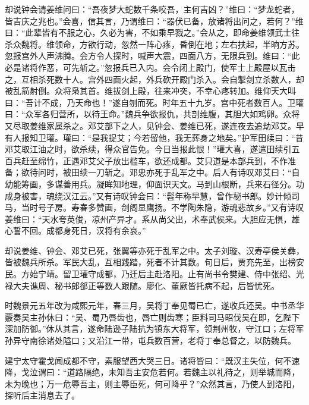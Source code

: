 却说钟会请姜维问曰：“吾夜梦大蛇数千条咬吾，主何吉凶？”维曰：“梦龙蛇者，皆吉庆之兆也。”会喜，信其言，乃谓维曰：“器伏已备，放诸将出问之，若何？”维曰：“此辈皆有不服之心，久必为害，不如乘早戮之。”会从之，即命姜维领武士往杀众魏将。维领命，方欲行动，忽然一阵心疼，昏倒在地；左右扶起，半晌方苏。忽报宫外人声沸腾。会方令人探时，喊声大震，四面八方，无限兵到。维曰：“此必是诸将作恶，可先斩之。”忽报兵已入内。会令闭上殿门，使军士上殿屋以瓦击之，互相杀死数十人。宫外四面火起，外兵砍开殿门杀入。会自掣剑立杀数人，却被乱箭射倒。众将枭其首。维拔剑上殿，往来冲突，不幸心疼转加。维仰天大叫曰：“吾计不成，乃天命也！”遂自刎而死。时年五十九岁。宫中死者数百人。卫瓘曰：“众军各归营所，以待王命。”魏兵争欲报仇，共剖维腹，其胆大如鸡卵。众将又尽取姜维家属杀之。邓艾部下之人，见钟会、姜维已死，遂连夜去追劫邓艾。早有人报知卫瓘。瓘曰：“是我捉艾；今若留他，我无葬身之地矣。”护军田续曰：“昔邓艾取江油之时，欲杀续，得众官告免。今日当报此恨！”瓘大喜，遂遣田续引五百兵赶至绵竹，正遇邓艾父子放出槛车，欲还成都。艾只道是本部兵到，不作准备；欲待问时，被田续一刀斩之。邓忠亦死于乱军之中。后人有诗叹邓艾曰：“自幼能筹画，多谋善用兵。凝眸知地理，仰面识天文。马到山根断，兵来石径分。功成身被害，魂绕汉江云。”又有诗叹钟会曰：“髫年称早慧，曾作秘书郎。妙计倾司马，当时号子房。寿春多赞画，剑阁显鹰扬。不学陶朱隐，游魂悲故乡。”又有诗叹姜维曰：“天水夸英俊，凉州产异才。系从尚父出，术奉武侯来。大胆应无惧，雄心誓不回。成都身死日，汉将有余哀。”

却说姜维、钟会、邓艾已死，张翼等亦死于乱军之中。太子刘璇、汉寿亭侯关彝，皆被魏兵所杀。军民大乱，互相践踏，死者不计其数。旬日后，贾充先至，出榜安民。方始宁靖。留卫瓘守成都，乃迁后主赴洛阳。止有尚书令樊建、侍中张绍、光禄大夫谯周、秘书郎郤正等数人跟随。廖化、董厥皆托病不起，后皆忧死。

时魏景元五年改为咸熙元年，春三月，吴将丁奉见蜀已亡，遂收兵还吴。中书丞华覈奏吴主孙休曰：“吴、蜀乃唇齿也，唇亡则齿寒；臣料司马昭伐吴在即，乞陛下深加防御。”休从其言，遂命陆逊子陆抗为镇东大将军，领荆州牧，守江口；左将军孙异守南徐诸处隘口；又沿江一带，屯兵数百营，老将丁奉总督之，以防魏兵。

建宁太守霍戈闻成都不守，素服望西大哭三日。诸将皆曰：“既汉主失位，何不速降，戈泣谓曰：“道路隔绝，未知吾主安危若何。若魏主以礼待之，则举城而降，未为晚也；万一危辱吾主，则主辱臣死，何可降乎？”众然其言，乃使人到洛阳，探听后主消息去了。

